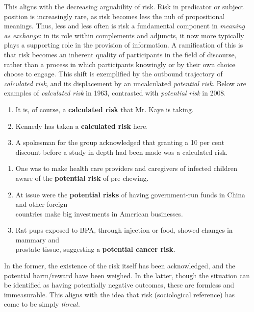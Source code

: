 
This aligns with the decreasing arguability of risk. Risk in predicator or subject position is increasingly rare, as risk becomes less the nub of propositional meanings. Thus, less and less often is risk a fundamental component in \emph{meaning as exchange}: in its role within complements and adjuncts, it now more typically plays a supporting role in the provision of information. A ramification of this is that risk becomes an inherent quality of participants in the field of discourse, rather than a process in which participants knowingly or by their own choice choose to engage. This shift is exemplified by the outbound trajectory of \emph{calculated risk}, and its displacement by an uncalculated \emph{potential risk}. Below are examples of \emph{calculated risk} in 1963, contrasted with \emph{potential risk} in 2008.

\begin{enumerate}   [before=\color{black}\ttfamily] \setlength\itemsep{0em} \small
\item It is, of course, a \textbf{calculated risk} that Mr. Kaye is taking.
\item Kennedy has taken a \textbf{calculated risk} here.
\item A spokesman for the group acknowledged that granting a 10 per cent discount before a study in depth had been made was a calculated risk.
\end{enumerate}

\begin{enumerate}   [before=\color{black}\ttfamily] \setlength \itemsep{0em} \small
\item One was to make health care providers and caregivers of infected children aware of the \textbf{potential risk} of pre-chewing.
\item At issue were the \textbf{potential risks} of having government-run funds in China and other foreign \\ countries make big investments in American businesses.
\item Rat pups exposed to BPA, through injection or food, showed changes in mammary and \\ prostate tissue, suggesting a \textbf{potential cancer risk}.
\end{enumerate}
%
In the former, the existence of the risk itself has been acknowledged, and the potential harm\slash reward have been weighed. In the latter, though the situation can be identified as having potentially negative outcomes, these are formless and immeasurable. This aligns with the idea that risk (sociological reference) has come to be simply \emph{threat}.

